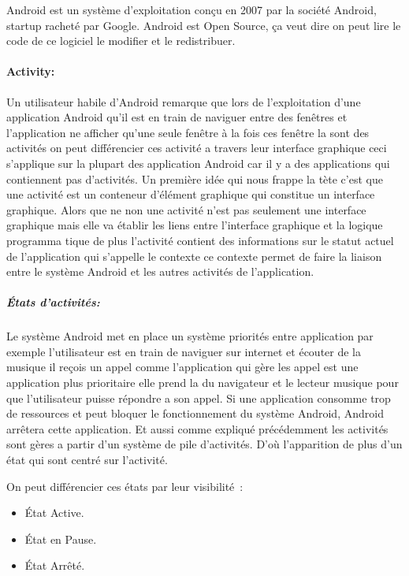 Android est un système d'exploitation conçu en 2007  par la société Android,
startup racheté par Google. Android est Open Source, ça veut dire on peut lire
le code de ce logiciel le modifier et le redistribuer.

\paragraph{Activity:}

Un utilisateur habile d'Android remarque que lors de l'exploitation d'une
application Android qu'il est en train de naviguer entre des fenêtres et
l'application ne afficher qu'une seule fenêtre à la fois ces fenêtre la sont
des activités on peut différencier ces activité a travers leur interface
graphique ceci s'applique sur la plupart des application Android car il y a
des applications qui contiennent pas d'activités. Un première idée qui nous
frappe la tète c'est que une activité est un conteneur d'élément graphique qui
constitue un interface graphique. Alors que ne non une activité n'est pas
seulement une interface graphique mais elle va établir les liens entre
l'interface graphique et la logique programma tique de plus l'activité
contient des informations sur le statut actuel de l'application qui s'appelle le
contexte ce contexte permet de faire la liaison entre le système Android et les
autres activités de l'application.

\subparagraph{États d'activités:}

Le système Android met en place un système priorités entre application
par exemple l'utilisateur est en train de naviguer sur internet et écouter
de la musique il reçois un appel comme l'application qui gère les appel est
une application plus prioritaire elle prend la du navigateur et le lecteur
musique pour que l'utilisateur puisse répondre a son appel. Si une application
consomme trop de ressources et peut bloquer le fonctionnement du système Android,
Android arrêtera cette application. Et aussi comme expliqué précédemment
les activités sont gères a partir d'un système de pile d'activités.
D'où l'apparition de plus d'un état qui sont centré sur l'activité.

On peut différencier ces états par leur visibilité :
\begin{itemize}
    \item État Active.
    \item État en Pause.
    \item État Arrêté.
\end{itemize}

